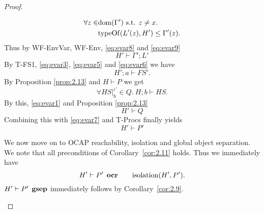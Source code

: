 \begin{proof}
\begin{description}
\begin{description}
\begin{description}
\begin{equation}
\begin{aligned}
                  \forall z \in &\mbox{$\mathrm{dom}$}(\Gamma') \text{ s.t. } z \neq x. \\
                  & \mbox{$\mathrm{typeOf}$}(L'(z), H') \leq \Gamma'(z).
                \end{aligned}
              \end{equation}
              Thus by {\sc WF-EnvVar}, {\sc WF-Env}, \eqref{eq:evar8} and
              \eqref{eq:evar9} 
              \begin{equation} \label{eq:evar6}
                H' \vdash \Gamma'; L'
              \end{equation}
              By {\sc T-FS1}, \eqref{eq:evar3}, \eqref{eq:evar5} and
              \eqref{eq:evar6} we have
              \begin{equation} \label{eq:evar7}
                H'; a \vdash FS'.
              \end{equation}
              By Proposition \ref{prop:2.13} and $H \vdash P$ we get
              \begin{equation*} 
                \forall HS|_b^{\iota'} \in Q. \: H; b \vdash HS.
              \end{equation*}
              By this, \eqref{eq:evar1} and Proposition \ref{prop:2.13}
              \begin{equation*}
                H' \vdash Q
              \end{equation*}
              Combining this with \eqref{eq:evar7} and {\sc T-Procs} finally
              yields
              \begin{equation*}
                H' \vdash P'
              \end{equation*}

              We now move on to OCAP reachability, isolation and global object
              separation. We note that all preconditions of
              Corollary~\ref{cor:2.11} holds. Thus we immediately have 
              \begin{equation*}
                H' \vdash P' \:\: \mbox{\bf ocr} \quad\quad \mbox{$\mathrm{isolation}$}(H', P').
              \end{equation*}
              $H' \vdash P' \:\: \mbox{\bf gsep}$ immediately follows by
              Corollary~\ref{cor:2.9}.


\end{description}
\end{description}
\end{description}
\end{proof}
